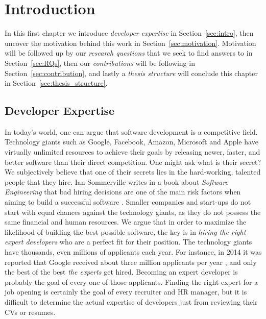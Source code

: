\chapter{Introduction}

    In this first chapter we introduce \emph{developer expertise} in Section~\ref{sec:intro}, then uncover the motivation behind this work in Section~\ref{sec:motivation}. Motivation will be followed up by our \emph{research questions} that we seek to find answers to in Section~\ref{sec:RQs}, then our \emph{contributions} will be following in Section~\ref{sec:contribution}, and lastly a \emph{thesis structure} will conclude this chapter in Section~\ref{sec:thesis_structure}.
    
    \section{Developer Expertise\label{sec:intro}}
    
        In today's world, one can argue that software development is a competitive field. Technology giants such as Google, Facebook, Amazon, Microsoft and Apple have virtually unlimited resources to achieve their goals by releasing newer, faster, and better software than their direct competition. One might ask what is their secret? We subjectively believe that one of their secrets lies in the hard-working, talented people that they hire. Ian Sommerville writes in a book about \emph{Software Engineering} that bad hiring decisions are one of the main risk factors when aiming to build a successful software \cite{sommerville2016software}. Smaller companies and start-ups do not start with equal chances against the technology giants, as they do not possess the same financial and human resources. We argue that in order to maximize the likelihood of building the best possible software, the key is in \emph{hiring the right expert developers} who are a perfect fit for their position. The technology giants have thousands, even millions of applicants each year. For instance, in 2014 it was reported that Google received about three million applicants per year \cite{nisen_2014}, and only the best of the best \emph{the experts} get hired. Becoming an expert developer is probably the goal of every one of those applicants. Finding the right expert for a job opening is certainly the goal of every recruiter and HR manager, but it is difficult to determine the actual expertise of developers just from reviewing their CVs or resumes.
    
